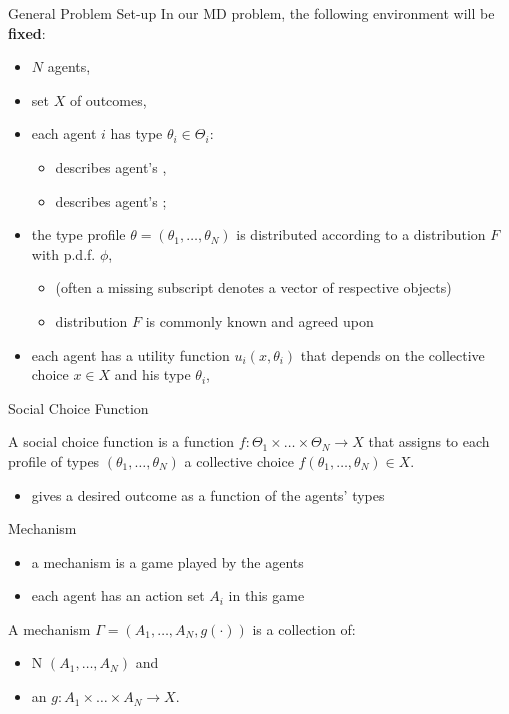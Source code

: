 \documentclass[english,10pt
,aspectratio=169
]{beamer}
\begin{document}
\begin{frame}{General Problem Set-up}
	In our MD problem, the following environment will be \textbf{fixed}:
	\begin{itemize}
		\item $N$ agents,
		\item set $X$ of \alert{outcomes},
		\item each agent $i$ has \alert{type} $\theta_i\in\Theta_{i}$:
		\begin{itemize}
			\item describes agent's ,
			\item describes agent's ;
		\end{itemize}
		\item the type profile $\theta=(\theta_1,\dots,\theta_{N})$ is distributed according to a distribution $F$ with p.d.f. $\phi$,
		\begin{itemize}
			\item (often a missing subscript denotes a vector of respective objects)
			\item distribution $F$ is commonly known and agreed upon
		\end{itemize}
		\item each agent has a \alert{utility} function $u_{i}(x,\theta_{i})$ that depends on the collective choice $x \in X$ and his type $\theta_i$,
	\end{itemize}
\end{frame}


\begin{frame}{Social Choice Function}
	\begin{definition}
		A \alert{social choice function} is a function \alert{$f:\Theta_{1}\times \dots\times\Theta_{N}\rightarrow X$} that assigns to each profile of types $(\theta_{1},\dots,\theta_{N})$ a collective choice $f(\theta_{1},\dots,\theta_{N})\in X$.
	\end{definition}
	\begin{itemize}
		\item gives a desired outcome as a function of the agents' types
	\end{itemize}
\end{frame}


\begin{frame}{Mechanism}
	\begin{itemize}
		\item a mechanism is a game played by the agents
		\item each agent has an action set $A_{i}$ in this game
	\end{itemize}
	\begin{definition}[mechanism]
		A \alert{mechanism} $\Gamma=(A_{1},\dots,A_{N},g(\cdot))$ is a collection of: 
		\begin{itemize}
			\item N  $(A_{1},\dots,A_{N})$ and 
			\item an  $g:A_{1}\times\dots\times A_{N}\rightarrow X$.
		\end{itemize}
	\end{definition}
\end{frame}
\end{document}
